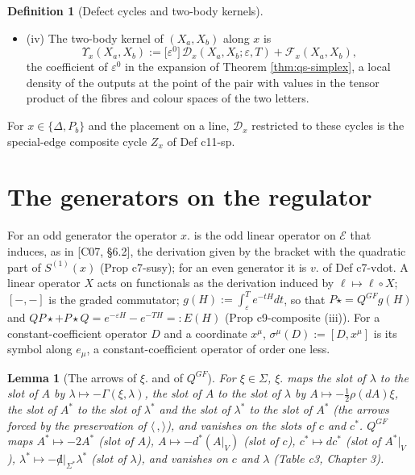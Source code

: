 \documentclass[11pt]{article}
\numberwithin{equation}{section}
\theoremstyle{plain}
\newtheorem{lemma}[theorem]{Lemma}
\theoremstyle{definition}
\newtheorem{definition}[theorem]{Definition}
\begin{document}
\begin{definition}[Defect cycles and two-body kernels]
\begin{itemize}
\begin{equation}
\label{eq:qs-finitesp}
\end{equation}
with $\{-,-\}_{H^m}$ the bracket built from $(H^m\otimes1)K_0$ in place of $K_0$ (eq c10-finitesp).
\item (iv) The two-body kernel of $(X_a,X_b)$ along $x$ is
\begin{equation}
\Upsilon_x(X_a,X_b):=\big[\varepsilon^0\big]\,\mathcal D_x(X_a,X_b;\varepsilon,T)+\mathcal F_x(X_a,X_b),
\label{eq:qs-kernel}
\end{equation}
the coefficient of $\varepsilon^0$ in the expansion of Theorem \ref{thm:qs-simplex}, a local density of the outputs at the point of the pair with values in the tensor product of the fibres and colour spaces of the two letters.
\end{itemize}
For $x\in\{\Delta,P_b\}$ and the placement on a line, $\mathcal D_x$ restricted to these cycles is the special-edge composite cycle $Z_x$ of Def c11-sp.
\end{definition}

\section{The generators on the regulator}
\label{sec:qs-reg}

For an odd generator the operator $x.$ is the odd linear operator on $\mathscr E$ that induces, as in [C07, §6.2], the derivation given by the bracket with the quadratic part of $S^{(1)}(x)$ (Prop c7-susy); for an even generator it is $v.$ of Def c7-vdot. A linear operator $X$ acts on functionals as the derivation induced by $\ell\mapsto\ell\circ X$; $[-,-]$ is the graded commutator; $g(H):=\int_\varepsilon^Te^{-tH}dt$, so that $P\star=Q^{GF}g(H)$ and $QP\star+P\star Q=e^{-\varepsilon H}-e^{-TH}=:E(H)$ (Prop c9-composite (iii)). For a constant-coefficient operator $D$ and a coordinate $x^\mu$, $\sigma^\mu(D):=[D,x^\mu]$ is its symbol along $e_\mu$, a constant-coefficient operator of order one less.

\begin{lemma}[The arrows of $\xi.$ and of $Q^{GF}$]
\label{lem:qs-arrows}
For $\xi\in\Sigma$, $\xi.$ maps the slot of $\lambda$ to the slot of $A$ by $\lambda\mapsto-\Gamma(\xi,\lambda)$, the slot of $A$ to the slot of $\lambda$ by $A\mapsto-\tfrac12\rho(dA)\xi$, the slot of $A^*$ to the slot of $\lambda^*$ and the slot of $\lambda^*$ to the slot of $A^*$ (the arrows forced by the preservation of $\langle\,,\rangle$), and vanishes on the slots of $c$ and $c^*$. $Q^{GF}$ maps $A^*\mapsto-2A^*$ (slot of $A$), $A\mapsto-d^*(A|_V)$ (slot of $c$), $c^*\mapsto dc^*$ (slot of $A^*|_V$), $\lambda^*\mapsto-{\not d}|_{\Sigma^*}\lambda^*$ (slot of $\lambda$), and vanishes on $c$ and $\lambda$ (Table c3, Chapter 3).
\end{lemma}
\end{document}
